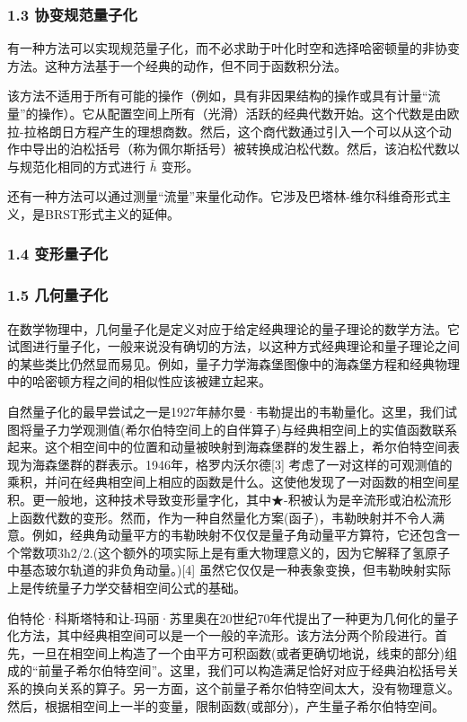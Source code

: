 \subsubsection{1.3 协变规范量子化}
有一种方法可以实现规范量子化，而不必求助于叶化时空和选择哈密顿量的非协变方法。这种方法基于一个经典的动作，但不同于函数积分法。

该方法不适用于所有可能的操作（例如，具有非因果结构的操作或具有计量“流量”的操作）。它从配置空间上所有（光滑）活跃的经典代数开始。这个代数是由欧拉-拉格朗日方程产生的理想商数。然后，这个商代数通过引入一个可以从这个动作中导出的泊松括号（称为佩尔斯括号）被转换成泊松代数。然后，该泊松代数以与规范化相同的方式进行 $\bar{h}$ 变形。


还有一种方法可以通过测量“流量”来量化动作。它涉及巴塔林-维尔科维奇形式主义，是BRST形式主义的延伸。

\subsubsection{1.4 变形量子化}

\subsubsection{1.5 几何量子化}

在数学物理中，几何量子化是定义对应于给定经典理论的量子理论的数学方法。它试图进行量子化，一般来说没有确切的方法，以这种方式经典理论和量子理论之间的某些类比仍然显而易见。例如，量子力学海森堡图像中的海森堡方程和经典物理中的哈密顿方程之间的相似性应该被建立起来。

自然量子化的最早尝试之一是1927年赫尔曼·韦勒提出的韦勒量化。这里，我们试图将量子力学观测值(希尔伯特空间上的自伴算子)与经典相空间上的实值函数联系起来。这个相空间中的位置和动量被映射到海森堡群的发生器上，希尔伯特空间表现为海森堡群的群表示。1946年，格罗内沃尔德[3] 考虑了一对这样的可观测值的乘积，并问在经典相空间上相应的函数是什么。这使他发现了一对函数的相空间星积。更一般地，这种技术导致变形量字化，其中★-积被认为是辛流形或泊松流形上函数代数的变形。然而，作为一种自然量化方案(函子)，韦勒映射并不令人满意。例如，经典角动量平方的韦勒映射不仅仅是量子角动量平方算符，它还包含一个常数项3ħ2/2.(这个额外的项实际上是有重大物理意义的，因为它解释了氢原子中基态玻尔轨道的非负角动量。)[4] 虽然它仅仅是一种表象变换，但韦勒映射实际上是传统量子力学交替相空间公式的基础。

伯特伦·科斯塔特和让-玛丽·苏里奥在20世纪70年代提出了一种更为几何化的量子化方法，其中经典相空间可以是一个一般的辛流形。该方法分两个阶段进行。首先，一旦在相空间上构造了一个由平方可积函数(或者更确切地说，线束的部分)组成的“前量子希尔伯特空间”。这里，我们可以构造满足恰好对应于经典泊松括号关系的换向关系的算子。另一方面，这个前量子希尔伯特空间太大，没有物理意义。然后，根据相空间上一半的变量，限制函数(或部分)，产生量子希尔伯特空间。


